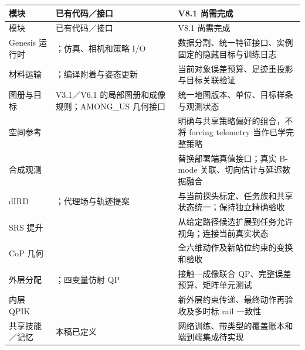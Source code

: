 \documentclass[UTF8,11pt,a4paper,fontset=fandol]{ctexart}
\numberwithin{equation}{section}
\theoremstyle{definition}
\newcommand{\RealBase}{https://github.com/NingMeng0903/RealUS_playground/blob/6a943e3dcf8c6ea68b9f75c398eb1f4307a9b81a}
\newcommand{\AmongBase}{https://github.com/NingMeng0903/AMONG_US/blob/f1ffc5078d6a08c32b59107ab16086a7bbde488e}
\begin{document}
\small
\begin{longtable}{P{35mm}P{58mm}P{57mm}}
\toprule
模块 & 已有代码／接口 & V8.1 尚需完成\\\midrule
\endfirsthead
\toprule 模块 & 已有代码／接口 & V8.1 尚需完成\\\midrule
\endhead
Genesis 运行时 & \href{\RealBase/src/projects/genesis_ue_sync/sim_platform/simulation/runtime.py}{}；仿真、相机和策略 I/O & 数据分割、统一特征接口、实例固定的隐藏目标与训练日志\\
材料运输 & \href{\RealBase/src/projects/genesis_ue_sync/anatomy_retarget/material_runtime_v13.py}{}；编译附着与姿态更新 & 当前对象误差预算、足迹重投影与目标关联验证\\
图册与目标 & V3.1／V6.1 的局部图册和成像规则；AMONG\_US 几何接口 & 统一地图版本、单位、目标样条与观测状态\\
空间参考 & \href{\AmongBase/DMP_playground/core_algorithms/spatial_dmp.py}{} & 明确与共享策略偏好的组合，不将 forcing telemetry 当作已学完整策略\\
合成观测 & \href{\AmongBase/DMP_playground/core_algorithms/observation.py}{} & 替换部署端真值接口；真实 B-mode 关联、切向估计与延迟数据融合\\
dIRD & \href{\RealBase/ird_playground/README.md}{}；代理场与轨迹提案 & 与当前探头标定、任务族和共享状态统一；保持独立精确验收\\
SRS 提升 & \href{\RealBase/ird_playground/ird_playground/optimization/srs_trajectory_dp.py}{} & 从给定路径候选扩展到任务允许视角；连接当前真实状态\\
CoP 几何 & \href{\RealBase/peirastic/contact_qp/geometry.py}{} & 全六维动作及新站位约束的变换和验收\\
外层分配 & \href{\RealBase/peirastic/contact_qp/weighted_outer.py}{}；四变量仿射 QP & 接触—成像联合 QP、完整误差预算、矩阵单元测试\\
内层 QPIK & \href{\RealBase/rm75_control/rm75_control/control/joint_admittance_8dof/solver/qp_builder.py}{} & 新外层约束传递、最终动作再验收及多时标 rail 一致性\\
共享技能／记忆 & 本稿已定义 & 网络训练、带类型的覆盖账本和端到端集成待实现\\\bottomrule
\end{longtable}
\normalsize
\end{document}
